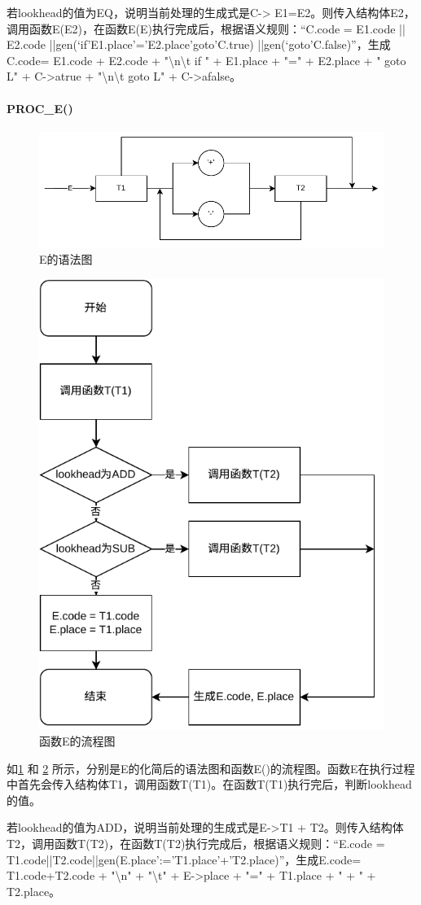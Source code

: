 \documentclass{ctexrep}
\begin{document}
若lookhead的值为EQ，说明当前处理的生成式是C-> E1=E2。则传入结构体E2，调用函数E(E2)，在函数E(E)执行完成后，根据语义规则：“C.code = E1.code || E2.code ||gen(‘if’E1.place’=’E2.place’goto’C.true) ||gen(‘goto’C.false)”，生成C.code= E1.code + E2.code + "\textbackslash{}n\textbackslash{}t if " + E1.place + "=" + E2.place + " goto L" + C->atrue + "\textbackslash{}n\textbackslash{}t goto L" + C->afalse。

\paragraph{PROC\_E()}
\begin{figure}
    \centering
    \includegraphics[width = .8\linewidth]{e.drawio.pdf}
    \caption{E的语法图}
    \label{fig:e}
\end{figure}
\begin{figure}
    \centering
    \includegraphics[width = .4\linewidth]{001E.drawio.png.pdf}
    \caption{函数E的流程图}
    \label{fig:proc-e}
\end{figure}
如\cref{fig:e} 和 \cref{fig:proc-e} 所示，分别是E的化简后的语法图和函数E()的流程图。函数E在执行过程中首先会传入结构体T1，调用函数T(T1)。在函数T(T1)执行完后，判断lookhead的值。

若lookhead的值为ADD，说明当前处理的生成式是E->T1 + T2。则传入结构体T2，调用函数T(T2)，在函数T(T2)执行完成后，根据语义规则：“E.code = T1.code||T2.code||gen(E.place’:=’T1.place’+’T2.place)”，生成E.code= T1.code+T2.code + "\textbackslash{}n" + "\textbackslash{}t" + E->place + "=" + T1.place + " + " + T2.place。
\end{document}
